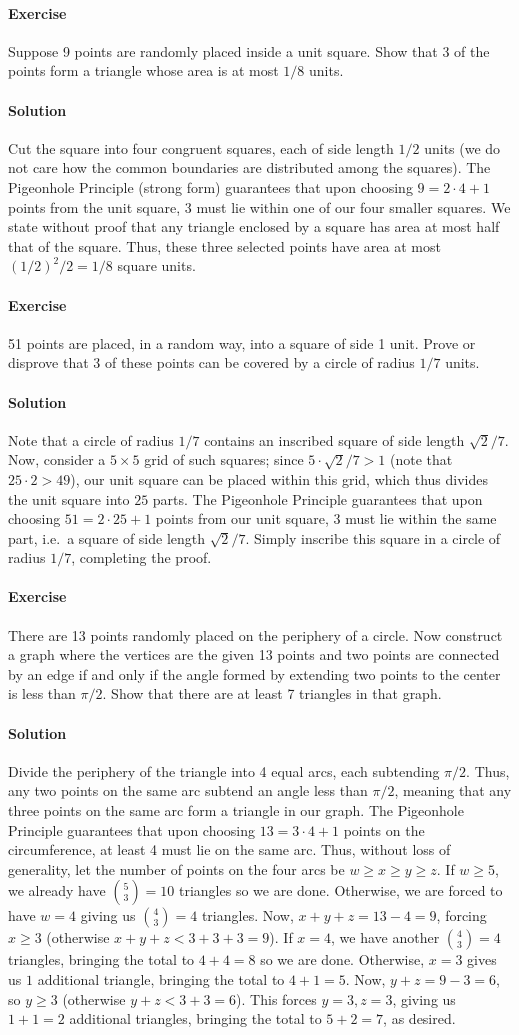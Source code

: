 \documentclass[10pt]{article}
\newcounter{prob}
\newcommand{\problem}{\stepcounter{prob}\paragraph{Exercise \arabic{prob}}}
\newcommand{\solution}{\paragraph{Solution}}
\begin{document}
    \problem Suppose 9 points are randomly placed inside a unit square. Show that 3
    of the points form a triangle whose area is at most $1 / 8$ units.

    \solution Cut the square into four congruent squares, each of side length $1 / 2$
    units (we do not care how the common boundaries are distributed among the
    squares). The Pigeonhole Principle (strong form) guarantees that upon choosing $9
    = 2\cdot 4 + 1$ points from the unit square, 3 must lie within one of our four
    smaller squares. We state without proof that any triangle enclosed by a square
    has area at most half that of the square. Thus, these three selected points have
    area at most $(1 / 2)^2 / 2 = 1 / 8$ square units.

    \problem 51 points are placed, in a random way, into a square of side 1
    unit. Prove or disprove that 3 of these points can be covered by a circle of
    radius $1 / 7$ units.

    \solution Note that a circle of radius $1 / 7$ contains an inscribed square of
    side length $\sqrt{2} / 7$. Now, consider a $5\times 5$ grid of such squares;
    since $5\cdot \sqrt{2} / 7 > 1$ (note that $25\cdot 2 > 49$), our unit square can
    be placed within this grid, which thus divides the unit square into $25$ parts.
    The Pigeonhole Principle guarantees that upon choosing $51 = 2\cdot 25 + 1$
    points from our unit square, 3 must lie within the same part, i.e.\ a square of
    side length $\sqrt{2} / 7$. Simply inscribe this square in a circle of radius $1
    / 7$, completing the proof.

    \problem There are 13 points randomly placed on the periphery of a circle. Now
    construct a graph where the vertices are the given 13 points and two points are
    connected by an edge if and only if the angle formed by extending two points to
    the center is less than $\pi / 2$. Show that there are at least 7 triangles in
    that graph.

    \solution Divide the periphery of the triangle into 4 equal arcs, each subtending
    $\pi / 2$. Thus, any two points on the same arc subtend an angle less than $\pi /
    2$, meaning that any three points on the same arc form a triangle in our graph.
    The Pigeonhole Principle guarantees that upon choosing $13 = 3\cdot 4 + 1$ points
    on the circumference, at least 4 must lie on the same arc. Thus, without loss of
    generality, let the number of points on the four arcs be $w \geq x \geq y \geq
    z$. If $w \geq 5$, we already have $\binom{5}{3} = 10$ triangles so we are done.
    Otherwise, we are forced to have $w = 4$ giving us $\binom{4}{3} = 4$ triangles.
    Now, $x + y + z = 13 - 4 = 9$, forcing $x \geq 3$ (otherwise $x + y + z < 3 + 3 +
    3 = 9$). If $x = 4$, we have another $\binom{4}{3} = 4$ triangles, bringing the
    total to $4 + 4 = 8$ so we are done. Otherwise, $x = 3$ gives us $1$ additional
    triangle, bringing the total to $4 + 1 = 5$. Now, $y + z = 9 - 3 = 6$, so $y \geq
    3$ (otherwise $y + z < 3 + 3 = 6$). This forces $y = 3, z = 3$, giving us $1 + 1
    = 2$ additional triangles, bringing the total to $5 + 2 = 7$, as desired.
\end{document}
